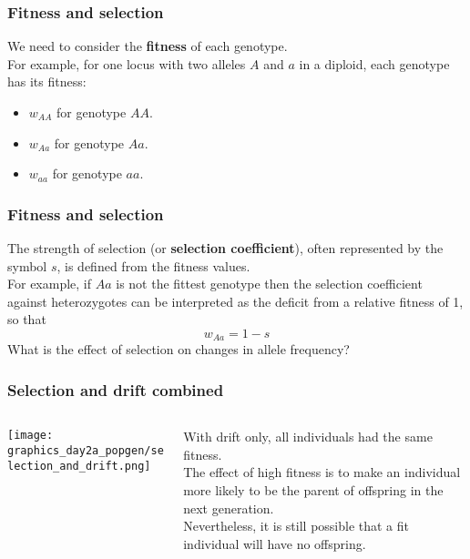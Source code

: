 \documentclass{beamer}
\newcommand{\1}{\ensuremath{\mathbf{1}}}
\begin{document}
%
%
%
\begin{frame}\frametitle{Fitness and selection}
	We need to consider the \textbf{fitness} of each genotype.\\[2ex]
	For example, for one locus with two alleles $A$ and $a$ in a diploid, each genotype has its fitness:
	\begin{itemize}
		\item $w_{AA}$ for genotype $AA$.
		\item $w_{Aa}$ for genotype $Aa$.
		\item $w_{aa}$ for genotype $aa$.
	\end{itemize}
\end{frame}
%
%
%
\begin{frame}\frametitle{Fitness and selection}
	The strength of selection (or \textbf{selection coefficient}), often represented by the symbol $s$, is defined from the fitness values.\\[2ex]
	For example, if $Aa$ is not the fittest genotype then the selection coefficient against heterozygotes can be interpreted as the deficit from a relative fitness of 1, so that
	\begin{equation}
		w_{Aa} = 1-s
	\end{equation}
	What is the effect of selection on changes in allele frequency?
\end{frame}
%
%
%
\begin{frame}\frametitle{Selection and drift combined}
	\begin{columns}
	\begin{column}{.5\textwidth}
		\begin{center}
			\texttt{[image: graphics\_day2a\_popgen/selection\_and\_drift.png]}
		\end{center}		
	\end{column}
	\begin{column}{.5\textwidth}
		With drift only, all individuals had the same fitness.\\[1.5ex]
		The effect of high fitness is to make an individual more likely to be the parent of offspring in the next generation.\\[1.5ex]
		Nevertheless, it is still possible that a fit individual will have no offspring.
	\end{column}
	\end{columns}
\end{frame}
\end{document}
